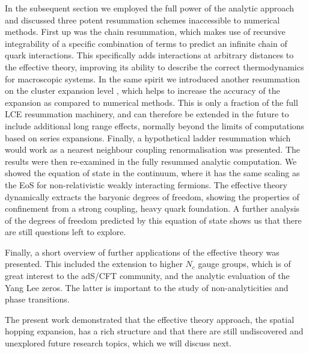 In the subsequent section we employed the full power of the analytic approach
and discussed three potent resummation schemes inaccessible to numerical
methods.  First up was the chain resummation, which makes use of recursive
integrability of a specific combination of terms to predict an infinite chain of
quark interactions. This specifically adds interactions at arbitrary distances
to the effective theory, improving its ability to describe the correct
thermodynamics for macroscopic systems. In the same spirit we introduced another
resummation on the cluster expansion level , which helps to increase the accuracy
of the expansion as compared to numerical methods. This is only a fraction of
the full LCE resummation machinery, and can therefore be extended in the future
to include additional long range effects, normally
beyond the limits of computations based on series expansions.
Finally, a hypothetical ladder resummation which would
work as a nearest neighbour coupling renormalisation was presented. The results
were then re-examined in the fully resummed analytic computation. We showed the
equation of state in the continuum, where it has the same scaling as the EoS for
non-relativistic weakly interacting fermions. The effective theory dynamically
extracts the baryonic degrees of freedom, showing the properties of confinement
from a strong coupling, heavy quark foundation. A further analysis of the
degrees of freedom predicted by this equation of state shows us that there are
still questions left to explore.

Finally, a short overview of further applications of the effective theory was
presented. This included the extension to higher $N_c$ gauge groups, which is of
great interest to the adS/CFT community, and the analytic evaluation of the Yang
Lee zeros. The latter is important to the study of non-analyticities and phase
transitions.

The present work demonstrated that the effective theory approach, the spatial
hopping expansion, has a rich structure and that there are still undiscovered
and unexplored future research topics, which we will discuss next.
